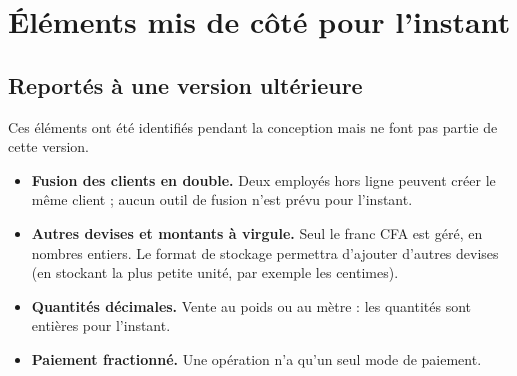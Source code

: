 \documentclass[11pt,a4paper]{article}
\begin{document}
	\section{Éléments mis de côté pour l'instant}\label{sec:miscote}
	\subsection{Reportés à une version ultérieure}
	Ces éléments ont été identifiés pendant la conception mais ne font pas partie de cette version.
	\begin{itemize}[leftmargin=*]
		\item \textbf{Fusion des clients en double.} Deux employés hors ligne peuvent créer le même client ; aucun outil de fusion n'est prévu pour l'instant.
		\item \textbf{Autres devises et montants à virgule.} Seul le franc CFA est géré, en nombres entiers. Le format de stockage permettra d'ajouter d'autres devises (en stockant la plus petite unité, par exemple les centimes).
		\item \textbf{Quantités décimales.} Vente au poids ou au mètre : les quantités sont entières pour l'instant.
		\item \textbf{Paiement fractionné.} Une opération n'a qu'un seul mode de paiement.
	\end{itemize}
\end{document}
